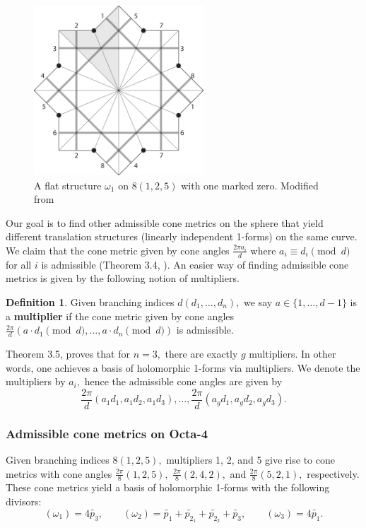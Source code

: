 \documentclass[12pt,reqno]{amsart}
\theoremstyle{definition}
\newtheorem{defn}{Definition}
\theoremstyle{remark}
\begin{document}
\begin{figure}[htbp]
   \centering
   \includegraphics[width=2.5in]{figures/125_flat.pdf} 
  \caption{A flat structure $\omega_1$ on $8(1, 2, 5)$ with one marked zero. Modified from \cite{dami}}
  \label{fig:125_flat}
\end{figure}

Our goal is to find other admissible cone metrics on the sphere that yield different translation structures (linearly independent 1-forms) on the same curve. We claim that the cone metric given by cone angles $\frac{2 \pi a_i}{d}$ where $a_i \equiv d_i \pmod d$ for all $i$ is admissible (Theorem 3.4, \cite{dthesis}). An easier way of finding admissible cone metrics is given by the following notion of multipliers.

\begin{defn} Given branching indices $d (d_1, \ldots , d_n),$ we say $a \in \{1, \ldots, d - 1\}$ is a \textbf{multiplier} if the cone metric given by cone angles $\frac{2 \pi}{d} (a \cdot d_1 \pmod d, \ldots , a \cdot d_n \pmod d)$ is admissible. 
\end{defn}

Theorem 3.5, \cite{dthesis} proves that for $n = 3,$ there are exactly $g$ multipliers. In other words, one achieves a basis of holomorphic 1-forms via multipliers. We denote the multipliers by $a_i,$ hence the admissible cone angles are given by $$\frac{2\pi}{d}(a_1 d_1, a_1 d_2, a_1 d_3), \ldots , \frac{2\pi}{d}(a_g d_1, a_g d_2, a_g d_3).$$ 

\subsubsection*{Admissible cone metrics on Octa-4} Given branching indices $8 (1, 2, 5),$ multipliers 1, 2, and 5 give rise to cone metrics with cone angles $\frac{2 \pi}{8}(1, 2, 5),$ $\frac{2 \pi}{8}(2, 4, 2),$ and $\frac{2 \pi}{8}(5, 2, 1),$ respectively. These cone metrics yield a basis of holomorphic 1-forms with the following divisors: $$(\omega_1) = 4 \widetilde{p_3}, \qquad (\omega_2) = \widetilde{p_1} + \widetilde{p_{2_1}} + \widetilde{p_{2_2}} + \widetilde{p_3}, \qquad (\omega_3) = 4 \widetilde{p_1}.$$
\end{document}
